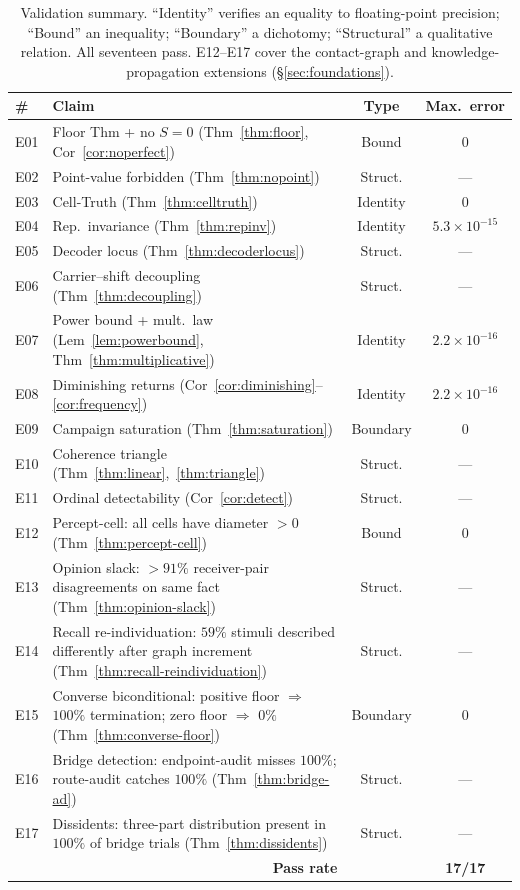 \documentclass[twocolumn,11pt,a4paper]{article}
\theoremstyle{adv}
\theoremstyle{definition}
\theoremstyle{remark}
\begin{document}
\begin{table}[t]
\centering
\small
\caption{Validation summary. ``Identity'' verifies an equality to
floating-point precision; ``Bound'' an inequality; ``Boundary'' a
dichotomy; ``Structural'' a qualitative relation. All seventeen pass.
E12--E17 cover the contact-graph and knowledge-propagation extensions
(\S\ref{sec:foundations}).}
\label{tab:validation}
\begin{tabular}{@{}llcc@{}}
\toprule
\# & Claim & Type & Max.\ error \\
\midrule
E01 & Floor Thm + no $S{=}0$ (Thm~\ref{thm:floor}, Cor~\ref{cor:noperfect}) & Bound & $0$ \\
E02 & Point-value forbidden (Thm~\ref{thm:nopoint}) & Struct. & --- \\
E03 & Cell-Truth (Thm~\ref{thm:celltruth}) & Identity & $0$ \\
E04 & Rep.\ invariance (Thm~\ref{thm:repinv}) & Identity & $5.3{\times}10^{-15}$ \\
E05 & Decoder locus (Thm~\ref{thm:decoderlocus}) & Struct. & --- \\
E06 & Carrier--shift decoupling (Thm~\ref{thm:decoupling}) & Struct. & --- \\
E07 & Power bound + mult.\ law (Lem~\ref{lem:powerbound}, Thm~\ref{thm:multiplicative}) & Identity & $2.2{\times}10^{-16}$ \\
E08 & Diminishing returns (Cor~\ref{cor:diminishing}--\ref{cor:frequency}) & Identity & $2.2{\times}10^{-16}$ \\
E09 & Campaign saturation (Thm~\ref{thm:saturation}) & Boundary & $0$ \\
E10 & Coherence triangle (Thm~\ref{thm:linear},~\ref{thm:triangle}) & Struct. & --- \\
E11 & Ordinal detectability (Cor~\ref{cor:detect}) & Struct. & --- \\
\midrule
E12 & Percept-cell: all cells have diameter $>0$ (Thm~\ref{thm:percept-cell}) & Bound & $0$ \\
E13 & Opinion slack: $>91\%$ receiver-pair disagreements on same fact (Thm~\ref{thm:opinion-slack}) & Struct. & --- \\
E14 & Recall re-individuation: $59\%$ stimuli described differently after graph increment (Thm~\ref{thm:recall-reindividuation}) & Struct. & --- \\
E15 & Converse biconditional: positive floor $\Rightarrow$ $100\%$ termination; zero floor $\Rightarrow$ $0\%$ (Thm~\ref{thm:converse-floor}) & Boundary & $0$ \\
E16 & Bridge detection: endpoint-audit misses $100\%$; route-audit catches $100\%$ (Thm~\ref{thm:bridge-ad}) & Struct. & --- \\
E17 & Dissidents: three-part distribution present in $100\%$ of bridge trials (Thm~\ref{thm:dissidents}) & Struct. & --- \\
\midrule
\multicolumn{2}{r}{\textbf{Pass rate}} & & \textbf{17/17} \\
\bottomrule
\end{tabular}
\end{table}
\end{document}
